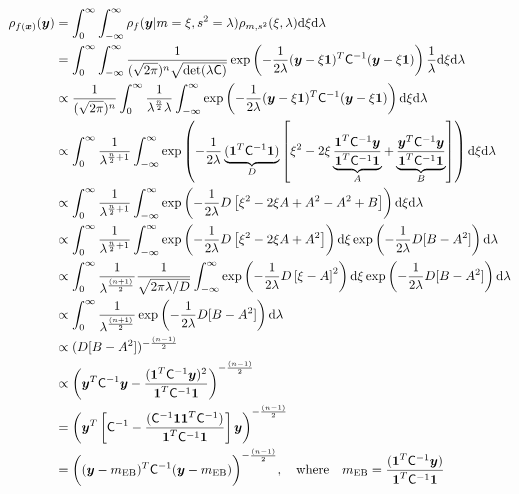 \documentclass{svjour3}                     %
\newcommand{\bm}[1]{\boldsymbol{#1}}
\newcommand{\dif}[1]{\text{d}{#1}}
\newcommand{\vx}{\bm{x}}
\newcommand{\vy}{\bm{y}}
\newcommand{\vone}{\bm{1}}
\newcommand{\mC}{\mathsf{C}}
\newcommand{\mCInv}{\mathsf{C}^{-1}}
\newcommand{\MLE}{\textup{EB}}
\begin{document}
\begin{align*}
\rho_{f(\vx)}(\vy) &=\int_{0}^\infty \int_{-\infty}^\infty \rho_{f} (\vy | m=\xi, s^2=\lambda) 
\rho_{m,s^2} (\xi, \lambda) \dif{\xi} \dif{\lambda} 
\\
&= \int_{0}^\infty \int_{-\infty}^\infty \frac{1}{(\sqrt{2 \pi})^n \sqrt{\det(\lambda \mC)}} 
\exp \left( -\frac{1}{2\lambda} (\vy - \xi \vone)^T\mCInv (\vy- \xi\vone)\right) \frac{1}{\lambda} \dif{\xi} \dif{\lambda}
\\
& \propto \frac{1}{(\sqrt{2 \pi})^n} \int_{0}^\infty \frac{1}{\lambda ^{\frac n2} \lambda}
\int_{-\infty}^\infty \exp \left( -\frac{1}{2\lambda} (\vy - \xi \vone)^T\mCInv (\vy- \xi\vone)\right)  \dif{\xi} \dif{\lambda}
\\
& \propto \int_{0}^\infty \frac{1}{\lambda^{\frac n2 + 1}}
\int_{-\infty}^\infty \exp \left( -\frac{1}{2\lambda} 
\underbrace{(\vone^T \mCInv \vone)}_{D}
\left[
\xi^2 -2 \xi \underbrace{\frac{\vone^T \mCInv \vy }{\vone^T \mCInv \vone}}_{A} + \underbrace{\frac{\vy^T \mCInv \vy }{\vone^T \mCInv \vone}}_{B} 
\right]
\right)  \dif{\xi} \dif{\lambda}
\\
& \propto \int_{0}^\infty \frac{1}{\lambda^{\frac n2 + 1}}
\int_{-\infty}^\infty \exp \left( -\frac{1}{2\lambda} D
\left[
\xi^2 -2 \xi A + A^2 - A^2 + B
\right]
\right)  \dif{\xi} \dif{\lambda}
\\
& \propto \int_{0}^\infty \frac{1}{\lambda^{\frac n2 + 1}}
\int_{-\infty}^\infty \exp \left( -\frac{1}{2\lambda} D
\left[
\xi^2 -2 \xi A + A^2
\right]
\right) \dif{\xi}
\exp \left(  - \frac{1}{2\lambda} D [B - A^2] \right)
\dif{\lambda}
\\
& \propto \int_{0}^\infty \frac{1}{\lambda^{\frac{(n+1)}{2}}}
\frac{1}{\sqrt{2\pi\lambda/D}}
\int_{-\infty}^\infty \exp \left( -\frac{1}{2\lambda} D
\left[
\xi-A
\right]^2
\right) \dif{\xi}
\exp \left(  - \frac{1}{2\lambda} D [B - A^2] \right)
\dif{\lambda}
\\
& \propto \int_{0}^\infty \frac{1}{\lambda^{\frac{(n+1)}{2}}}
\exp \left(  - \frac{1}{2\lambda} D [B - A^2] \right)
\dif{\lambda}
\\
& \propto (D[B-A^2])^{-\frac{(n-1)}{2}}
\\
& \propto \left(\vy^T\mCInv\vy - \frac{(\vone^T\mCInv\vy)^2}{\vone^T\mCInv\vone} \right)^{-\frac{(n-1)}{2}}
\\
&=  \left(\vy^T \left[\mCInv - \frac{(\mCInv\vone \vone^T \mCInv)}{\vone^T\mCInv\vone} \right]\vy \right)^{-\frac{(n-1)}{2}}
\\
&=  \biggl((\vy-m_\MLE)^T \mCInv (\vy-m_\MLE) \biggr)^{-\frac{(n-1)}{2}}, 
\quad \text{where} \quad
m_\MLE=\frac{(\vone^T \mCInv \vy)}{\vone^T\mCInv\vone}
\end{align*}
\end{document}
